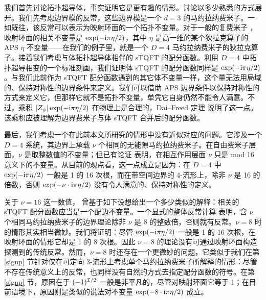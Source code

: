 我们首先讨论拓扑超导体，事实证明它是更有趣的情形。讨论以多少熟悉的方式展开。我们先考虑边界模的反常，这些边界模是一个 $d=3$ 的马约拉纳费米子。一如既往，该反常可以表示为映射环面的一个拓扑不变量。对于一般的复费米子 \cite{Global}，映射环面的相关不变量是 $\exp(-{\mathrm i}\pi\eta/2)$，其中 $\eta$ 是高一维的某个狄拉克算子的 APS $\eta$ 不变量——在我们的例子里，就是一个 $D=4$ 马约拉纳费米子的狄拉克算子。接着我们考虑与体拓扑超导体相伴的 sTQFT 的配分函数。利用 $D=4$ 中拓扑超导相变的一个标准刻画，我们证明体 sTQFT 的配分函数同样是 $\exp(-{\mathrm i}\pi\eta/2)$。与我们此前作为 sTQFT 配分函数遇到的其它体不变量一样，这个量无法用局域的、保持对称性的边界条件来定义。我们可以借助 APS 边界条件以保持对称性的方式来定义它，但那样它就不是拓扑不变量，单凭它自身仍然不能令人满意。不过，乘积 $|Z_\psi|\exp(-{\mathrm i}\pi \eta/2)$ 在物理上是合理的，Dai--Freed 定理 \cite{DF} 说明了这一点。该乘积应被理解为边界费米子与体 sTQFT 合并后的配分函数。


最后，我们考虑一个在此前本文所研究的情形中没有近似对应的问题。它涉及一个 $D=4$ 系统，其边界上承载 $\nu$ 个相同的无能隙马约拉纳费米子。在自由费米子层面，$\nu$ 是取整数值的不变量；但已有论证 \cite{FCV,WS,MFCV,KitTwo} 表明，在相互作用层面 $\nu$ 只是 mod 16 意义下的不变量。从目前的观点看，这一点成立是因为：在 $D=4$ 中 $\exp(-{\mathrm i}\pi\eta/2)$ 一般是 1 的 16 次根，而在带空间边界的 4-流形上，除非 $\nu$ 是 16 的倍数，否则 $\exp(-\nu\cdot {\mathrm i}\pi\eta/2)$ 没有令人满意的、保持对称性的定义。


关于 $\nu=16$ 这一数值，\cite{KTTW} 曾基于如下设想给出一个多少类似的解释：相关的 sTQFT 配分函数应当是一个配边不变量。一个显式的整体反常计算 \cite{HCR} 表明，含 $\nu$ 个相同马约拉纳费米子的边界理论除非 $\nu$ 是 8 的整数倍，否则就有反常。$\nu=8$ 时的情形其实相当微妙。我们将证明：尽管 $\exp(-{\mathrm i}\pi\eta/2)$ 一般是 1 的 16 次根，在映射环面的情形它却是 1 的 8 次根。因此 $\nu=8$ 的理论没有可通过映射环面构造探测到的传统反常。然而，$\nu=8$ 时还存在一个更微妙的问题，它类似于我们在第 \ref{signp} 节针对仅在可定向 3-流形上考虑单个马约拉纳费米子所解释的情形：尽管不存在传统意义上的反常，也同样没有自然的方式去指定配分函数的符号。在第 \ref{signp} 节，原因在于 $(-1)^{{\mathcal I}/2}$ 一般是非平凡的，尽管对映射环面它等于 1；在目前语境下，原因则是类似的说法对不变量 $\exp(-8\cdot{\mathrm i}\pi\eta/2)$ 成立。

